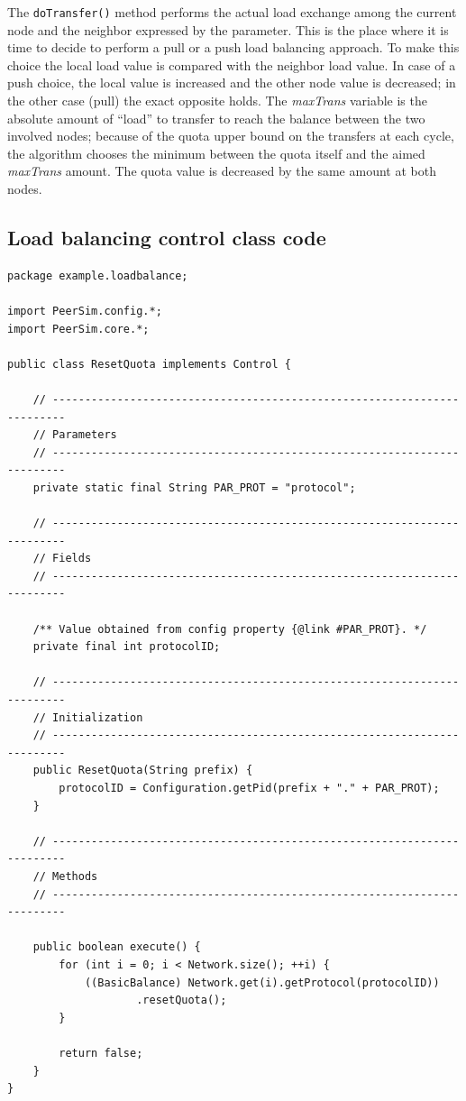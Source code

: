 \documentclass[a4paper,11pt]{article}
\begin{document}
The \texttt{doTransfer()} method performs the actual load exchange
among the current node and the neighbor expressed by the parameter.
This is the place where it is time to decide to perform a pull or a
push load balancing approach. To make this choice the local load value
is compared with the neighbor load value. In case of a push choice,
the local value is increased and the other node value is decreased;
in the other case (pull) the exact opposite holds. The \emph{maxTrans}
variable is the absolute amount of ``{}load'' to transfer
to reach the balance between the two involved nodes; because of the
quota upper bound on the transfers at each cycle, the algorithm chooses
the minimum between the quota itself and the aimed \emph{maxTrans}
amount. The quota value is decreased by the same amount at both nodes.


\subsection{Load balancing control class code}

\footnotesize
\begin{verbatim}
package example.loadbalance;

import PeerSim.config.*;
import PeerSim.core.*;

public class ResetQuota implements Control {

    // ------------------------------------------------------------------------
    // Parameters
    // ------------------------------------------------------------------------
    private static final String PAR_PROT = "protocol";

    // ------------------------------------------------------------------------
    // Fields
    // ------------------------------------------------------------------------

    /** Value obtained from config property {@link #PAR_PROT}. */
    private final int protocolID;

    // ------------------------------------------------------------------------
    // Initialization
    // ------------------------------------------------------------------------
    public ResetQuota(String prefix) {
        protocolID = Configuration.getPid(prefix + "." + PAR_PROT);
    }

    // ------------------------------------------------------------------------
    // Methods
    // ------------------------------------------------------------------------

    public boolean execute() {
        for (int i = 0; i < Network.size(); ++i) {
            ((BasicBalance) Network.get(i).getProtocol(protocolID))
                    .resetQuota();
        }

        return false;
    }
}
\end{verbatim}
\normalsize
\end{document}
